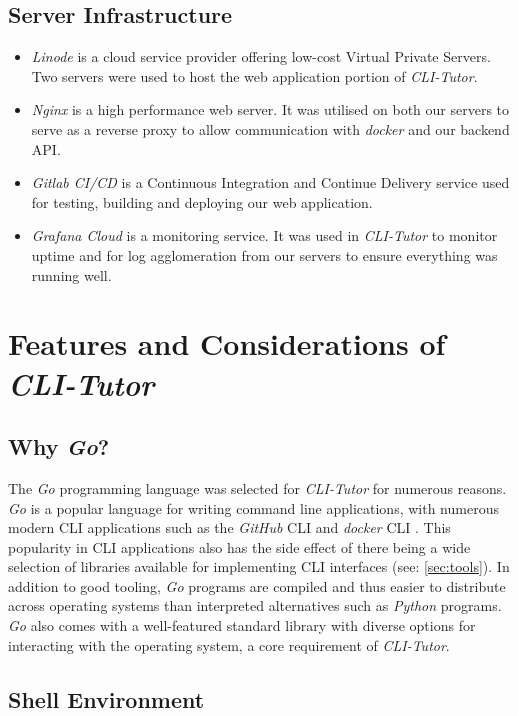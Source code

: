 \subsection{Server Infrastructure}
\begin{itemize}
    \item \textit{Linode} is a cloud service provider offering low-cost Virtual Private Servers. Two servers were used to host the web application portion of \textit{CLI-Tutor}.
    \item \textit{Nginx} is a high performance web server. It was utilised on
        both our servers to serve as a reverse proxy to allow communication
        with \textit{docker} and our backend API.
    \item \textit{Gitlab CI/CD} is a Continuous Integration and Continue Delivery service used for testing, building and deploying our web application.
    \item \textit{Grafana Cloud} is a monitoring service. It was used in
        \textit{CLI-Tutor} to monitor uptime and for log agglomeration from our
        servers to ensure everything was running well.
\end{itemize}

\section{Features and Considerations of \textit{CLI-Tutor}}

\subsection{Why \textit{Go}?} The \textit{Go} programming language was selected
for \textit{CLI-Tutor} for numerous reasons. \textit{Go} is a popular language
for writing command line applications, with numerous modern CLI applications
such as the \textit{GitHub} CLI \cite{github_cli} and \textit{docker} CLI
\cite{dockerinc_2022}. This popularity in CLI applications also has the side
effect of there being a wide selection of libraries available for implementing
CLI interfaces (see: \autoref{sec:tools}). In addition to good tooling,
\textit{Go} programs are compiled and thus easier to distribute across
operating systems than interpreted alternatives such as \textit{Python}
programs. \textit{Go} also comes with a well-featured standard library with
diverse options for interacting with the operating system, a core requirement
of \textit{CLI-Tutor}.


\subsection{Shell Environment}

